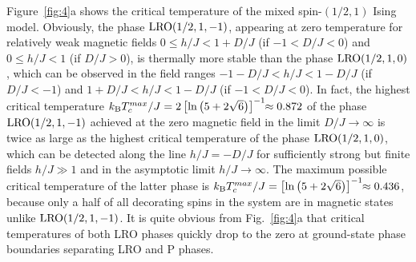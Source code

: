\documentclass[final,5p,times,sort&compress]{elsarticle}
\begin{document}
Figure~\ref{fig:4}a shows the critical temperature of the mixed spin-$(1/2,1)$ Ising model. Obviously, the phase ${\rm LRO}(1/2, 1,-1)$, appearing at zero temperature for relatively weak magnetic fields $0 \leq h/J < 1 + D/J$ (if $-1<D/J<0$) and $0\leq h/J < 1$ (if $D/J>0$), is thermally more stable than the phase ${\rm LRO}(1/2, 1,0)$, which can be observed in the field ranges $-1-D/J < h/J < 1 - D/J$ (if $D/J<-1$) and $1+D/J < h/J < 1 - D/J$ (if $-1<D/J<0$). In fact, the highest critical temperature $k_{\rm B}T_c^{max}/J = 2\left[\ln\left(5+2\sqrt{6}\right)\right]^{-1}\!\!\approx 0.872$ of the phase ${\rm LRO}(1/2, 1,-1)$ achie\-ved at the zero magnetic field in the limit $D/J\to\infty$ is twice as large as the highest critical temperature of the phase \linebreak ${\rm LRO}(1/2, 1,0)$, which can be detected along the line $h/J=-D/J$ for sufficiently strong but finite fields $h/J\gg 1$ and in the asymptotic limit $h/J\to\infty$. The maximum possible critical temperature of the latter phase is $k_{\rm B}T_c^{max}/J = \left[\ln\left(5+2\sqrt{6}\right)\right]^{-1}\!\!\approx 0.436$, because only a half of all decorating spins in the system are in magnetic states unlike ${\rm LRO}(1/2, 1,-1)$. It is quite obvious from Fig.~\ref{fig:4}a that critical temperatures of both LRO phases quickly drop to the zero at ground-state phase boundaries separating LRO and P phases.
\end{document}
